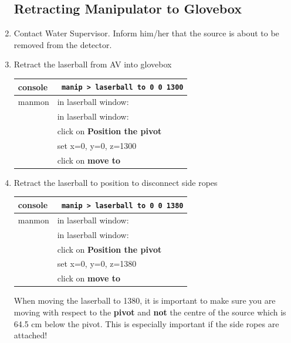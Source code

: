 \documentclass[11pt]{article}
\begin{document}
\begin{enumerate}
\subsection{Retracting Manipulator to Glovebox}
\item \CheckBox[name=rmg1]{} Contact Water Supervisor. Inform him/her that the source is about to be removed from the detector.
\item \CheckBox[name=rmg2]{} Retract the laserball from AV into glovebox
 \begin{center}
\begin{tabular}{|l|l|}
\hline
console & \verb+ manip > laserball to 0 0 1300+ \\
\hline
manmon & in laserball window: \\ &  in laserball window:\\ & click on {\bf Position the pivot} \\ & set x=0, y=0, z=1300 \\ & click on {\bf move to} \\
\hline
\end{tabular}
\end{center}
\item \CheckBox[name=rmg2]{} Retract the laserball to position to disconnect side ropes
 \begin{center}
\begin{tabular}{|l|l|}
\hline
console & \verb+ manip > laserball to 0 0 1380+ \\
\hline
manmon & in laserball window: \\ &  in laserball window:\\ & click on {\bf Position the pivot} \\ & set x=0, y=0, z=1380 \\ & click on {\bf move to} \\
\hline
\end{tabular}
\end{center}
When moving the laserball to 1380, it is important to make sure you are moving with respect to the {\bf pivot} and {\bf not} the centre of the source which is 64.5 cm below the pivot. This is especially important if the side ropes are attached!


\end{enumerate}
\end{document}
